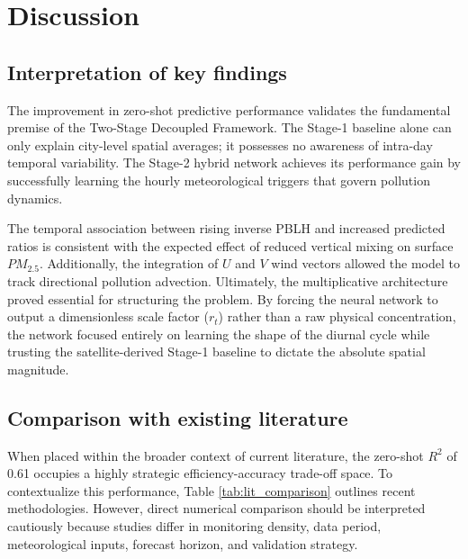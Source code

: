 \section{Discussion}

\subsection{Interpretation of key findings}
The improvement in zero-shot predictive performance validates the fundamental premise of the Two-Stage Decoupled Framework. The Stage-1 baseline alone can only explain city-level spatial averages; it possesses no awareness of intra-day temporal variability. The Stage-2 hybrid network achieves its performance gain by successfully learning the hourly meteorological triggers that govern pollution dynamics. 

The temporal association between rising inverse PBLH and increased predicted ratios is consistent with the expected effect of reduced vertical mixing on surface $PM_{2.5}$. Additionally, the integration of $U$ and $V$ wind vectors allowed the model to track directional pollution advection. Ultimately, the multiplicative architecture proved essential for structuring the problem. By forcing the neural network to output a dimensionless scale factor ($r_t$) rather than a raw physical concentration, the network focused entirely on learning the shape of the diurnal cycle while trusting the satellite-derived Stage-1 baseline to dictate the absolute spatial magnitude.

\subsection{Comparison with existing literature}
When placed within the broader context of current literature, the zero-shot $R^2$ of 0.61 occupies a highly strategic efficiency-accuracy trade-off space. To contextualize this performance, Table \ref{tab:lit_comparison} outlines recent methodologies. However, direct numerical comparison should be interpreted cautiously because studies differ in monitoring density, data period, meteorological inputs, forecast horizon, and validation strategy. 


